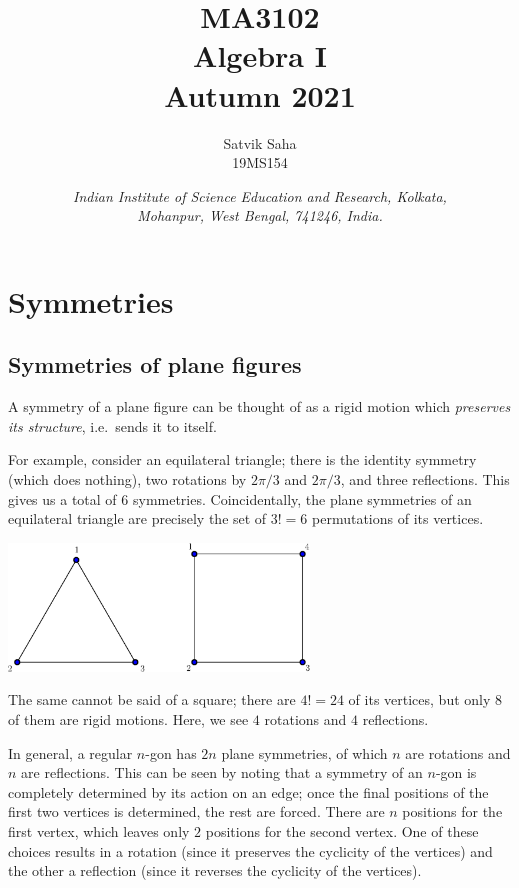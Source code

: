\documentclass[11pt]{article}
\title{
    \Large\textsc{MA3102} \\
    \Huge \textbf{Algebra I} \\
    \vspace{5pt}
    \Large{Autumn 2021}
}
\author{
    \large Satvik Saha
    \\\textsc{\small 19MS154}
}
\date{\normalsize
    \textit{Indian Institute of Science Education and Research, Kolkata, \\
    Mohanpur, West Bengal, 741246, India.} \\
}
\theoremstyle{definition}
\theoremstyle{remark}
\numberwithin{equation}{section}
\begin{document}
    \maketitle

    \tableofcontents

    \section{Symmetries}
    \subsection{Symmetries of plane figures}
    A symmetry of a plane figure can be thought of as a rigid motion which
    \emph{preserves its structure}, i.e.\ sends it to itself.

    For example, consider an equilateral triangle; there is the identity symmetry
    (which does nothing), two rotations by $2\pi / 3$ and $2\pi / 3$, and three
    reflections. This gives us a total of $6$ symmetries. Coincidentally, the plane
    symmetries of an equilateral triangle are precisely the set of $3! = 6$
    permutations of its vertices.

    \begin{center}
        \includegraphics[width=0.6\textwidth]{./triangle_square.eps}
    \end{center}

    The same cannot be said of a square; there are $4! = 24$ of its vertices, but
    only $8$ of them are rigid motions. Here, we see $4$ rotations and $4$
    reflections.

    In general, a regular $n$-gon has $2n$ plane symmetries, of which $n$ are
    rotations and $n$ are reflections. This can be seen by noting that a symmetry of
    an $n$-gon is completely determined by its action on an edge; once the final
    positions of the first two vertices is determined, the rest are forced. There are
    $n$ positions for the first vertex, which leaves only $2$ positions for the
    second vertex. One of these choices results in a rotation (since it preserves the
    cyclicity of the vertices) and the other a reflection (since it reverses the
    cyclicity of the vertices).
\end{document}
